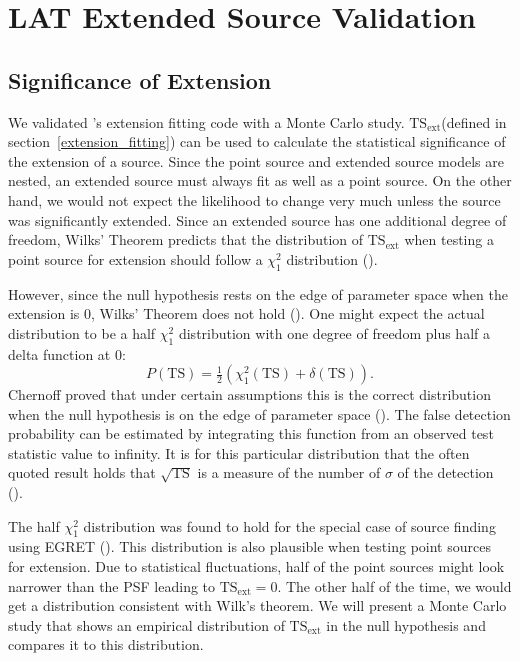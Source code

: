 \documentclass[12pt,preprint]{aastex}
\newcommand{\tsext}{{\ensuremath{\text{TS}_\text{ext}}}\xspace}
\newcommand{\ts}{\text{TS}\xspace}
\newcommand{\pointlike}{\text{\em pointlike}\xspace}
\begin{document}
\section{LAT Extended Source Validation}


\subsection{Significance of Extension}
\label{monte_carlo_validation}

We validated \pointlike's extension fitting code with a Monte Carlo
study. \tsext (defined in section~\ref{extension_fitting}) can be used to calculate the statistical significance
of the extension of a source.  Since the point source and extended source models are
nested, an extended source must always fit as well as a point source.  On the other hand, we would
not expect the likelihood to change very much unless the source was
significantly extended.  Since an extended source has one additional
degree of freedom, Wilks' Theorem predicts that the distribution of $\tsext$
when testing a point source for extension should follow a $\chi^2_1$
distribution (\cite{wilks_theorem}).

However, since the null hypothesis rests on the edge of
parameter space when the extension is 0, Wilks' Theorem does not hold
(\cite{warn_wilks_theorem}).  One might expect the actual distribution
to be a half $\chi^2_1$ distribution with one degree of freedom plus
half a delta function at 0:
\begin{equation}
  P(\ts)=\tfrac{1}{2}(\chi^2_1(\ts)+\delta(\ts)).
\end{equation}
Chernoff proved that under certain assumptions this is the correct distribution
when the null hypothesis is on the edge of parameter
space (\cite{chernoff}).  The false detection
probability can be estimated by integrating this function from an observed
test statistic value to infinity. It is for this particular distribution
that the often quoted result holds that $\sqrt{\ts}$ is a measure of
the number of $\sigma$ of the detection (\cite{mattox_egret}).

The half $\chi^2_1$ distribution was found to hold for the special case
of source finding using EGRET (\cite{mattox_egret}). This distribution
is also plausible when testing point sources for extension. Due to
statistical fluctuations, half of the point sources might look narrower
than the PSF leading to $\tsext=0$. The other half of the time, we would
get a distribution consistent with Wilk's theorem. We will present a
Monte Carlo study that shows an empirical distribution of \tsext in the
null hypothesis and compares it to this distribution.
\end{document}
